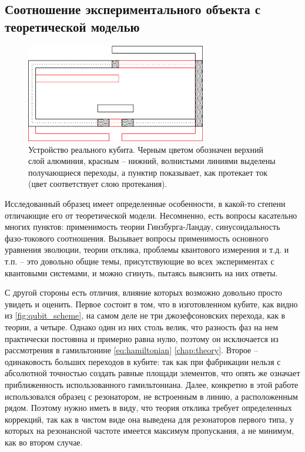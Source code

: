 \documentclass[12pt, twoside]{report}
\numberwithin{equation}{section}
\numberwithin{figure}{section}
\begin{document}
\subsection{Соотношение экспериментального объекта с теоретической моделью}

\begin{figure}
\begingroup
\captionsetup{justification=normal}
\centering
\includegraphics[width=0.7\textwidth]{Pictures/qubit_scheme}
\caption{Устройство реального кубита. Черным цветом обозначен верхний слой алюминия, красным -- нижний, волнистыми линиями выделены получающиеся переходы, а пунктир показывает, как протекает ток (цвет соответствует слою протекания).}
\label{fig:qubit_scheme}
\endgroup
\end{figure}

Исследованный образец имеет определенные особенности, в какой-то степени отличающие его от теоретической модели. Несомненно, есть вопросы касательно многих пунктов: применимость теории Гинзбурга-Ландау, синусоидальность фазо-токового соотношения. Вызывает вопросы применимость основного уравнения эволюции, теории отклика, проблемы квантового измерения и т.д. и т.п. -- это довольно общие темы, присутствующие во всех экспериментах с квантовыми системами, и можно сгинуть, пытаясь выяснить на них ответы.

С другой стороны есть отличия, влияние которых возможно довольно просто увидеть и оценить. Первое состоит в том, что в изготовленном кубите, как видно из \autoref{fig:qubit_scheme}, на самом деле не три джозефсоновских перехода, как в теории, а четыре. Однако один из них столь велик, что разность фаз на нем практически постоянна и примерно равна нулю, поэтому он исключается из рассмотрения в гамильтонине \eqref{eq:hamiltonian} \autoref{chap:theory}. Второе -- одинаковость больших переходов в кубите: так как при фабрикации нельзя с абсолютной точностью создать равные площади элементов, что опять же означает приближенность использованного гамильтониана. Далее, конкретно в этой работе использовался образец с резонатором, не встроенным в линию, а расположенным рядом. Поэтому нужно иметь в виду, что теория отклика требует определенных коррекций, так как в чистом виде она выведена для резонаторов первого типа, у которых на резонансной частоте имеется максимум пропускания, а не минимум, как во втором случае.
\end{document}
